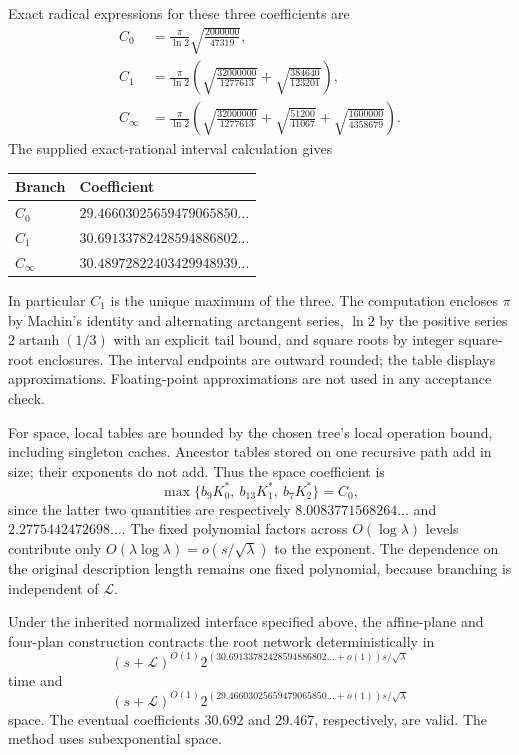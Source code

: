 Exact radical expressions for these three coefficients are
\begin{align*}
 C_0&=\frac\pi{\ln2}\sqrt{\frac{2000000}{47319}},\\
 C_1&=\frac\pi{\ln2}\left(
      \sqrt{\frac{32000000}{1277613}}
       +\sqrt{\frac{384640}{123201}}\right),\\
 C_\infty&=\frac\pi{\ln2}\left(
      \sqrt{\frac{32000000}{1277613}}
       +\sqrt{\frac{51200}{41067}}
       +\sqrt{\frac{1600000}{4358679}}\right).
\end{align*}
The supplied exact-rational interval calculation gives
\begin{center}
\begin{tabular}{ll}
\hline
Branch & Coefficient\\
\hline
$C_0$ & $29.46603025659479065850\ldots$\\
$C_1$ & $30.69133782428594886802\ldots$\\
$C_\infty$ & $30.48972822403429948939\ldots$\\
\hline
\end{tabular}
\end{center}
In particular $C_1$ is the unique maximum of the three. The computation
encloses $\pi$ by Machin's identity and alternating arctangent series,
$\ln2$ by the positive series $2\operatorname{artanh}(1/3)$ with an explicit
tail bound, and square roots by integer square-root enclosures.
The interval endpoints are outward rounded; the table displays approximations.
Floating-point approximations are not used in any acceptance check.

For space, local tables are bounded by the chosen tree's local operation
bound, including singleton caches. Ancestor tables stored on one recursive
path add in size; their exponents do not add. Thus the space coefficient is
\[
 \max\{b_9K_0^*,\ b_{13}K_1^*,\ b_7K_2^*\}=C_0,
\]
since the latter two quantities are respectively
$8.0083771568264\ldots$ and $2.2775442472698\ldots$.
The fixed polynomial factors across $O(\log\lambda)$ levels contribute
only $O(\lambda\log\lambda)=o(s/\sqrt\lambda)$ to the exponent.
The dependence on the original description length remains one fixed
polynomial, because branching is independent of $\mathcal L$.

\begin{theorem}
Under the inherited normalized interface specified above, the affine-plane
and four-plan construction contracts the root network deterministically in
\[
 (s+\mathcal L)^{O(1)}
 2^{(30.69133782428594886802\ldots+o(1))s/\sqrt\lambda}
\]
time and
\[
 (s+\mathcal L)^{O(1)}
 2^{(29.46603025659479065850\ldots+o(1))s/\sqrt\lambda}
\]
space. The eventual coefficients $30.692$ and $29.467$, respectively, are
valid. The method uses subexponential space.
\end{theorem}

